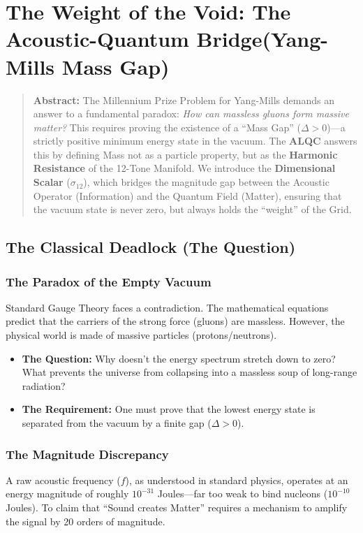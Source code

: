 \documentclass[11pt, letterpaper]{article}
\begin{document}
\section{The Weight of the Void: The Acoustic-Quantum Bridge(Yang-Mills Mass Gap)}\label{sec:2}
\label{sec:4.1}

\begin{quote}
    \textbf{Abstract:} The Millennium Prize Problem for Yang-Mills demands an answer to a fundamental paradox: \textit{How can massless gluons form massive matter?} This requires proving the existence of a ``Mass Gap'' ($\Delta > 0$)—a strictly positive minimum energy state in the vacuum. The \textbf{ALQC} answers this by defining Mass not as a particle property, but as the \textbf{Harmonic Resistance} of the 12-Tone Manifold. We introduce the \textbf{Dimensional Scalar} ($\sigma_{12}$), which bridges the magnitude gap between the Acoustic Operator (Information) and the Quantum Field (Matter), ensuring that the vacuum state is never zero, but always holds the ``weight'' of the Grid.
\end{quote}

\subsection{The Classical Deadlock (The Question)}\label{sec:2.1}

\subsubsection{The Paradox of the Empty Vacuum}
Standard Gauge Theory faces a contradiction. The mathematical equations predict that the carriers of the strong force (gluons) are massless. However, the physical world is made of massive particles (protons/neutrons).
\begin{itemize}
    \item \textbf{The Question:} Why doesn't the energy spectrum stretch down to zero? What prevents the universe from collapsing into a massless soup of long-range radiation?
    \item \textbf{The Requirement:} One must prove that the lowest energy state is separated from the vacuum by a finite gap ($\Delta > 0$).
\end{itemize}

\subsubsection{The Magnitude Discrepancy}
A raw acoustic frequency ($f$), as understood in standard physics, operates at an energy magnitude of roughly $10^{-31}$ Joules—far too weak to bind nucleons ($10^{-10}$ Joules). To claim that ``Sound creates Matter'' requires a mechanism to amplify the signal by 20 orders of magnitude.
\end{document}
